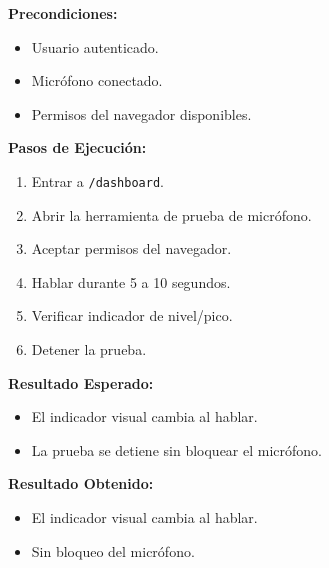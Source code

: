 \documentclass[12pt, a4paper]{article}
\newcommand{\prioChip}[2]{%
  \colorbox{#1}{\textcolor{white}{\footnotesize\textbf{#2}}}%
}
\newcommand{\statusChip}[2]{%
  \colorbox{#1}{\textcolor{white}{\footnotesize\textbf{#2}}}%
}
\begin{document}
\vspace{0.3cm}

\begin{tcolorbox}[enhanced, breakable, colback=white, colframe=espe-blue,
  boxrule=1pt, arc=5pt,
  title={\textbf{CP-02} \enspace Prueba de micr\'ofono \hfill \prioChip{alta}{Alta} \enspace \statusChip{paso-green}{PASO}},
  fonttitle=\color{white},
  attach boxed title to top left={yshift=-2mm,xshift=4mm},
  boxed title style={colback=espe-blue,arc=3pt}]
\begin{minipage}[t]{0.48\linewidth}
\textbf{Precondiciones:}
\begin{itemize}[noitemsep,topsep=2pt]
  \item Usuario autenticado.
  \item Micr\'ofono conectado.
  \item Permisos del navegador disponibles.
\end{itemize}
\textbf{Pasos de Ejecuci\'on:}
\begin{enumerate}[noitemsep,topsep=2pt]
  \item Entrar a \texttt{/dashboard}.
  \item Abrir la herramienta de prueba de micr\'ofono.
  \item Aceptar permisos del navegador.
  \item Hablar durante 5 a 10 segundos.
  \item Verificar indicador de nivel/pico.
  \item Detener la prueba.
\end{enumerate}
\end{minipage}\hfill
\begin{minipage}[t]{0.48\linewidth}
\textbf{Resultado Esperado:}
\begin{itemize}[noitemsep,topsep=2pt]
  \item El indicador visual cambia al hablar.
  \item La prueba se detiene sin bloquear el micr\'ofono.
\end{itemize}
\vspace{4pt}
\textbf{Resultado Obtenido:}
\begin{itemize}[noitemsep,topsep=2pt]
  \item[$\checkmark$] El indicador visual cambia al hablar.
  \item[$\checkmark$] Sin bloqueo del micr\'ofono.
\end{itemize}
\end{minipage}
\end{tcolorbox}
\end{document}
